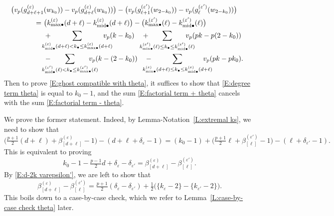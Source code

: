 \documentclass[12pt]{amsart}
\theoremstyle{definition}
\numberwithin{equation}{subsection}
\newcommand{\midd}{\mathrm{mid}}
\begin{document}
\begin{align}
\nonumber
\big( v_p(g^{(\varepsilon)}_{d+\ell+1}& (w_{k_0}))-v_p(g^{(\varepsilon)}_{d+\ell}(w_{k_0})) \big) - \big( v_p(g^{(\varepsilon')}_{\ell+1}(w_{2-{k_0}}))-v_p(g^{(\varepsilon')}_{\ell}(w_{2-{k_0}})) \big)
\\
\label{E:degree term theta}
=\ &\big( k^{(\varepsilon)}_{{\max}\bullet}(d+\ell) - k^{(\varepsilon)}_{{\midd}\bullet}(d+\ell) \big)- \big( k^{(\varepsilon')}_{{\max}\bullet}(\ell) - k^{(\varepsilon')}_{{\midd}\bullet}(\ell)\big)
\\
\label{E:factorial term + theta}
&+  \hspace{-15pt}\sum_{
k^{(\varepsilon)}_{\midd\bullet}(d+\ell) < k_\bullet \leq k^{(\varepsilon)}_{{\max}\bullet}(d+\ell)}
\hspace{-15pt}v_p(k-k_0)\quad + \hspace{-15pt} \sum_{
k^{(\varepsilon')}_{{\min}\bullet}(\ell) \leq k_\bullet \leq k^{(\varepsilon')}_{{\midd}\bullet}(\ell)}
\hspace{-15pt}v_p(pk-p(2-k_0))\quad 
\\
\label{E:factorial term - theta}
&-  \hspace{-15pt} \sum_{
k^{(\varepsilon')}_{{\midd}\bullet}(\ell) < k_\bullet \leq k^{(\varepsilon')}_{{\max}\bullet}(\ell)}
\hspace{-15pt}v_p(k-(2-k_0))\quad - \hspace{-15pt}\sum_{
k^{(\varepsilon)}_{{\min}\bullet}(d+\ell) \leq k_\bullet \leq k^{(\varepsilon)}_{{\midd}\bullet}(d+\ell)}
\hspace{-15pt}v_p(pk-pk_0).
\end{align}
Then to prove \eqref{E:ghost compatible with theta}, it suffices to show that \eqref{E:degree term theta} is equal to $k_0-1$, and the sum \eqref{E:factorial term + theta} cancels with the sum \eqref{E:factorial term - theta}.

We prove the former statement. Indeed, by Lemma-Notation~\ref{L:extremal ks}, we need to show that
$$
\big(\tfrac{p+1}2 (d+\ell) + \beta_{[d+\ell]}^{(\varepsilon)}-1\big) - (d+\ell + \delta_\varepsilon -1)  = (k_0-1) + \big(\tfrac{p+1}2 \ell + \beta_{[\ell]}^{(\varepsilon')}-1\big) - (\ell + \delta_{\varepsilon'} -1).
$$
This is equivalent to proving
\begin{equation}
k_0-1-\tfrac{p-1}2 d +\delta_\varepsilon - \delta_{\varepsilon'} = \beta_{[d+\ell]}^{(\varepsilon)} - \beta_{[\ell]}^{(\varepsilon')}.
\end{equation}
By \eqref{E:d-2k varepsilon'}, we are left to show that
$$
\beta_{[d+\ell]}^{(\varepsilon)} - \beta_{[\ell]}^{(\varepsilon')} = \tfrac{p+1}2( \delta_\varepsilon -\delta_{\varepsilon'}) +\tfrac 12\big( \{k _\varepsilon -2\} - \{k_{\varepsilon '}-2\}\big).
$$
This boils down to a case-by-case check, which we refer to Lemma~\ref{L:case-by-case check theta} later.
\end{document}

